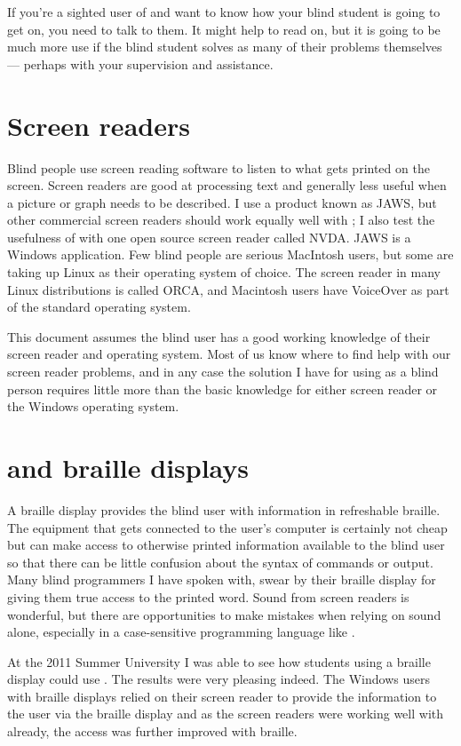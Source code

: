 If you're a sighted user of \R{} and want to know how your blind student is going to get on, you need to talk to them. It might help to read on, but it is going to be much more use if the blind student solves as many of their problems themselves --- perhaps with your supervision and assistance.

\section{Screen readers}

Blind people use screen reading software to listen to what gets printed on the screen. Screen readers are good at processing text and generally less useful when a picture or graph needs to be described. I use a product known as JAWS, but other commercial screen readers should work equally well with \R{}; I also test the usefulness of \R{} with one open source screen reader called NVDA. JAWS is a Windows application. Few blind people are serious MacIntosh users, but some are taking up Linux as their operating system of choice. The screen reader in many Linux distributions is called ORCA, and Macintosh users have VoiceOver as part of the standard operating system.

This document assumes the blind user has a good working knowledge of their screen reader and operating system. Most of us know where to find help with our screen reader problems, and in any case the solution I have for using \R{} as a blind person requires little more than the basic knowledge for either screen reader or the Windows operating system.


\section{\R{} and braille displays}

A braille display provides the blind user with information in refreshable braille. The equipment that gets connected to the user's computer is certainly not cheap but can make access to otherwise printed information available to the blind user so that there can be little confusion about the syntax of commands or output. Many blind programmers I have spoken with, swear by their braille display for giving them true access to the printed word. Sound from screen readers is wonderful, but there are opportunities to make mistakes when relying on sound alone, especially in a case-sensitive programming language like \R{}.

At the 2011 Summer University I was able to see how students using a braille display could use \R{}. The results were very pleasing indeed. The Windows users with braille displays relied on their screen reader to provide the information to the user via the braille display and as the screen readers were working well with \R{} already, the access was further improved with braille. 

